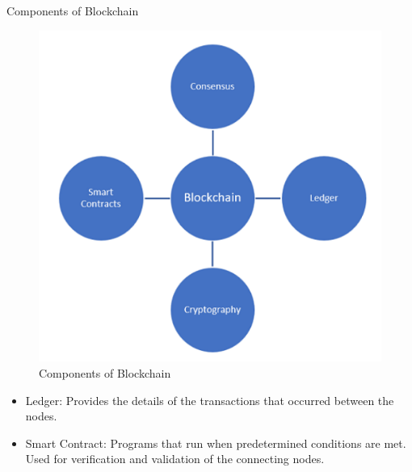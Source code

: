 \documentclass{beamer}
\begin{document}
\begin{frame}{Components of Blockchain \cite{sw_hw_sec_2021}}

\begin{minipage}{0.5\textwidth}
        \begin{figure}
           \centering
           \includegraphics[width=0.75\linewidth]{pic/blockchain_components.png}
           \caption{Components of Blockchain}
          \label{fig:components-of-blockchain}
      \end{figure}
\end{minipage}%
\begin{minipage}{0.5\textwidth}
    \centering
    \begin{itemize}
        \item {Ledger: Provides the details of the transactions that occurred between the nodes.}
        \item {Smart Contract:  Programs that run when predetermined conditions are met. Used for verification and validation of the connecting nodes.}
    \end{itemize}
\end{minipage}
\end{frame}
\end{document}
